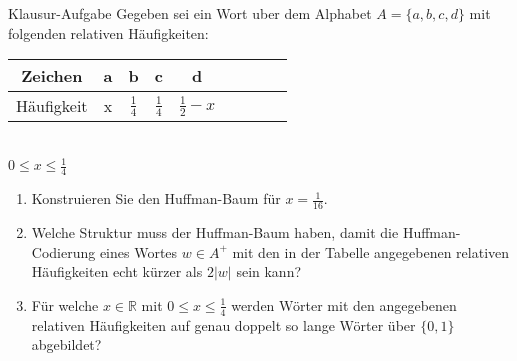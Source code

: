 \begin{frame}[plain]
	\begin{block}{Klausur-Aufgabe}
  Gegeben sei ein Wort uber dem Alphabet $A = \{a, b, c, d\}$ mit folgenden relativen Häufigkeiten:
    \begin{tabular}{ccccccccc}
      \toprule
      Zeichen&a&b&c&d&\\
      \midrule
      Häufigkeit & x & $\frac{1}{4}$ & $\frac{1}{4}$ & $\frac{1}{2} - x$\\
      \bottomrule
    \end{tabular}\\
    $0 \leq x \leq \frac{1}{4}$\pause
		\begin{enumerate}
			\item Konstruieren Sie den Huffman-Baum für $x = \frac{1}{16}$.
      \item Welche Struktur muss der Huffman-Baum haben, damit die Huffman-Codierung
            eines Wortes $w \in A^+$ mit den in der Tabelle angegebenen relativen
            Häufigkeiten echt kürzer als $2|w|$ sein kann?
      \item Für welche $x \in \mathbb{R}$ mit $0 \leq x \leq \frac{1}{4}$ werden Wörter
            mit den angegebenen relativen Häufigkeiten auf genau doppelt so
            lange Wörter über $\{0, 1\}$ abgebildet?
		\end{enumerate}
	\end{block}
\end{frame}

